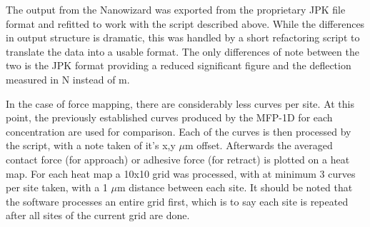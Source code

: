 The output from the Nanowizard was exported from the proprietary JPK file format and refitted to work with the script described above. While the differences in output structure is dramatic, this was handled by a short refactoring script to translate the data into a usable format. The only differences of note between the two is the JPK format providing a reduced significant figure and the deflection measured in N instead of m.

In the case of force mapping, there are considerably less curves per site. At this point, the previously established curves produced by the MFP-1D for each concentration are used for comparison. Each of the curves is then processed by the script, with a note taken of it's x,y $\mu$m offset. Afterwards the averaged contact force (for approach) or adhesive force (for retract) is plotted on a heat map. For each heat map a 10x10 grid was processed, with at minimum 3 curves per site taken, with a 1 $\mu$m distance between each site. It should be noted that the software processes an entire grid first, which is to say each site is repeated after all sites of the current grid are done.










